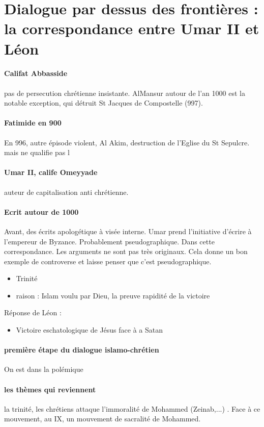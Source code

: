 \section{Dialogue par dessus des frontières : la correspondance entre Umar II et Léon}
\paragraph{Califat Abbasside} pas de persecution chrétienne insistante. AlMansur autour de l'an 1000 est la notable exception, qui détruit St Jacques de Compostelle (997). 
\paragraph{Fatimide en 900} En 996, autre épisode violent, Al Akim, destruction de l'Eglise du St Sepulcre. mais ne qualifie pas l
\paragraph{Umar II, calife Omeyyade} auteur de capitalisation anti chrétienne.
\paragraph{Ecrit autour de 1000} Avant, des écrits apologétique à visée interne. Umar prend l'initiative d'écrire à l'empereur de Byzance. Probablement pseudographique. Dans cette correspondance.
Les arguments ne sont pas très originaux. Cela donne un bon exemple de controverse et laisse penser que c'est pseudographique. 

\begin{itemize}
    \item Trinité
    \item raison : Islam voulu par Dieu, la preuve rapidité de la victoire
\end{itemize}

Réponse de Léon : 
\begin{itemize}
    \item Victoire eschatologique de Jésus face à a Satan
\end{itemize}

\paragraph{première étape du dialogue islamo-chrétien} On est dans la polémique


\paragraph{les thèmes qui reviennent} la trinité, 
les chrétiens attaque l'immoralité de Mohammed (Zeinab,...) . Face à ce mouvement, au IX, un mouvement de sacralité de Mohammed.

